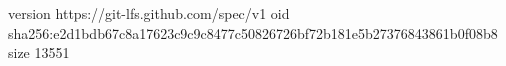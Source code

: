 version https://git-lfs.github.com/spec/v1
oid sha256:e2d1bdb67c8a17623c9c9c8477c50826726bf72b181e5b27376843861b0f08b8
size 13551
